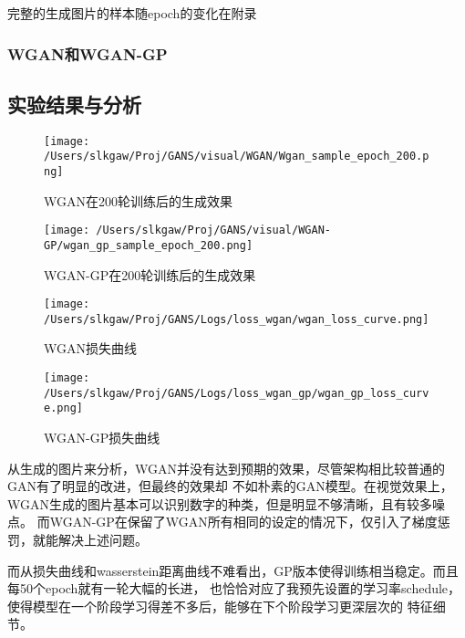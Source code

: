 \documentclass[12pt, a4paper]{article}
\begin{document}
\vspace{1cm}
完整的生成图片的样本随epoch的变化在附录


\clearpage
\subsubsection{WGAN和WGAN-GP}

\subsection{实验结果与分析}

\begin{figure}[htbp]
    \centering
    \begin{minipage}[t]{0.45\textwidth}
        \centering
        \texttt{[image: /Users/slkgaw/Proj/GANS/visual/WGAN/Wgan\_sample\_epoch\_200.png]}
        \caption{WGAN在200轮训练后的生成效果}
    \end{minipage}
    \hspace{0.04\textwidth}
    \begin{minipage}[t]{0.45\textwidth}
        \centering
        \texttt{[image: /Users/slkgaw/Proj/GANS/visual/WGAN-GP/wgan\_gp\_sample\_epoch\_200.png]}
        \caption{WGAN-GP在200轮训练后的生成效果}
    \end{minipage}
\end{figure}

\vspace{1cm}

\begin{figure}[htbp]
    \centering
    \texttt{[image: /Users/slkgaw/Proj/GANS/Logs/loss\_wgan/wgan\_loss\_curve.png]}
    \caption{WGAN损失曲线}
\end{figure}
\clearpage
\begin{figure}[htbp]
    \texttt{[image: /Users/slkgaw/Proj/GANS/Logs/loss\_wgan\_gp/wgan\_gp\_loss\_curve.png]}
    \caption{WGAN-GP损失曲线}
\end{figure}

从生成的图片来分析，WGAN并没有达到预期的效果，尽管架构相比较普通的GAN有了明显的改进，但最终的效果却
不如朴素的GAN模型。在视觉效果上，WGAN生成的图片基本可以识别数字的种类，但是明显不够清晰，且有较多噪点。
而WGAN-GP在保留了WGAN所有相同的设定的情况下，仅引入了梯度惩罚，就能解决上述问题。

而从损失曲线和wasserstein距离曲线不难看出，GP版本使得训练相当稳定。而且每50个epoch就有一轮大幅的长进，
也恰恰对应了我预先设置的学习率schedule，使得模型在一个阶段学习得差不多后，能够在下个阶段学习更深层次的
特征细节。
\end{document}
